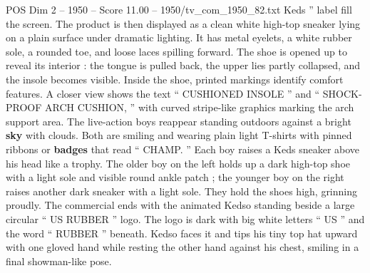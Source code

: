\begin{textsample}{POS Dim 2 – 1950 – Score 11.00 – 1950/tv\_com\_1950\_82.txt}
Keds ” label fill the screen.
The product is then displayed as a clean white high-top sneaker lying on a plain surface under dramatic lighting.
It has metal eyelets, a white rubber sole, a rounded toe, and loose laces spilling forward.
The shoe is opened up to reveal its interior : the tongue is pulled back, the upper lies partly collapsed, and the insole becomes visible.
Inside the shoe, printed markings identify comfort features.
A closer view shows the text “ CUSHIONED INSOLE ” and “ SHOCK-PROOF ARCH CUSHION, ” with curved stripe-like graphics marking the arch support area.
The live-action boys reappear standing outdoors against a bright \textbf{sky} with clouds.
Both are smiling and wearing plain light T-shirts with pinned ribbons or \textbf{badges} that read “ CHAMP. ” Each boy raises a Keds sneaker above his head like a trophy.
The older boy on the left holds up a dark high-top shoe with a light sole and visible round ankle patch ; the younger boy on the right raises another dark sneaker with a light sole.
They hold the shoes high, grinning proudly.
The commercial ends with the animated Kedso standing beside a large circular “ US RUBBER ” logo.
The logo is dark with big white letters “ US ” and the word “ RUBBER ” beneath.
Kedso faces it and tips his tiny top hat upward with one gloved hand while resting the other hand against his chest, smiling in a final showman-like pose.

\end{textsample}
